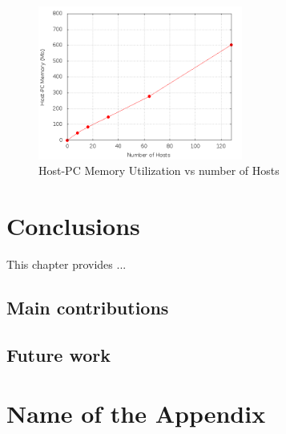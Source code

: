 \documentclass[12pt,english,oneside]{book}
\begin{document}
\begin{figure}[htbp]
        \centering
        \includegraphics[width=0.6\textwidth]{figures/mem2_utilization.png}
        \caption{Host-PC Memory Utilization vs number of Hosts}
        \label{fig:mem2}
\end{figure}
\newpage

\chapter{Conclusions\label{cha:conclusions}}

This chapter provides ...

\section{Main contributions}

\section{Future work}

\appendix

\chapter{Name of the Appendix}

\cleardoublepage


\cleardoublepage



\nocite{*}
\end{document}
